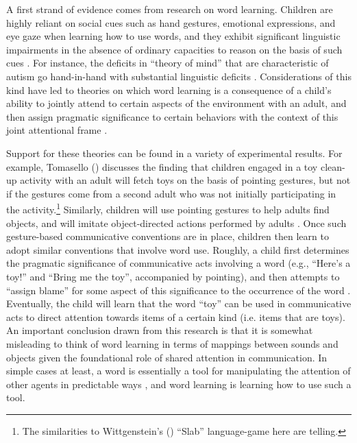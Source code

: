 A first strand of evidence comes from research on word learning. Children are highly reliant on social cues such as hand gestures, emotional expressions, and eye gaze when learning how to use words, and they exhibit significant linguistic impairments in the absence of ordinary capacities to reason on the basis of such cues \citep[][p. 1099-1100]{Bloom:2001}. For instance, the deficits in ``theory of mind'' that are characteristic of autism go hand-in-hand with substantial linguistic deficits \citep{Bloom:2001,Miller:2006,Harley:2014}. Considerations of this kind have led to theories on which word learning is a consequence of a child's ability to jointly attend to certain aspects of the environment with an adult, and then assign pragmatic significance to certain behaviors with the context of this joint attentional frame \citep{Tomasello:2005,Miller:2006}. 

Support for these theories can be found in a variety of experimental results. For example, Tomasello (\citeyear{Tomasello:2005}) discusses the finding that children engaged in a toy clean-up activity with an adult will fetch toys on the basis of pointing gestures, but not if the gestures come from a second adult who was not initially participating in the activity.\footnote{The similarities to Wittgenstein's (\citeyear{Wittgenstein:1953}) ``Slab'' language-game here are telling.} Similarly, children will use pointing gestures to help adults find objects, and will imitate object-directed actions performed by adults \citep{Tomasello:2001}. Once such gesture-based communicative conventions are in place, children then learn to adopt similar conventions that involve word use. Roughly, a child first determines the pragmatic significance of communicative acts involving a word (e.g., ``Here's a toy!'' and ``Bring me the toy'', accompanied by pointing), and then attempts to ``assign blame'' for some aspect of this significance to the occurrence of the word \citep[][p. 73]{Tomasello:2005}. Eventually, the child will learn that the word ``toy'' can be used in communicative acts to direct attention towards items of a certain kind (i.e. items that are toys). An important conclusion drawn from this research is that it is somewhat misleading to think of word learning in terms of mappings between sounds and objects given the foundational role of shared attention in communication. In simple cases at least, a word is essentially a tool for manipulating the attention of other agents in predictable ways \citep{Tomasello:2001}, and word learning is learning how to use such a tool. 


